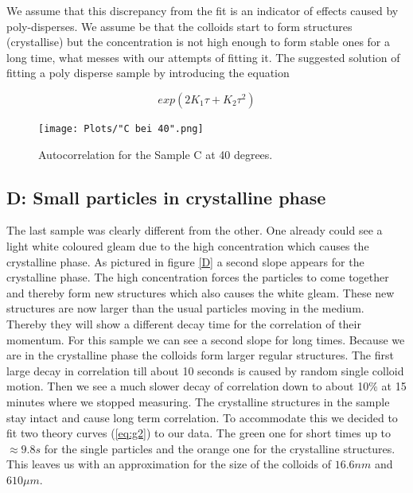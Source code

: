 \documentclass[]{article}
\begin{document}
We assume that this discrepancy from the fit is an indicator of effects caused by poly-disperses. We assume be that the colloids start to form structures (crystallise) but the concentration is not high enough to form stable ones for a long time, what messes with our attempts of fitting it. The suggested solution of fitting a poly disperse sample by introducing the equation 

\begin{equation}
	exp(2 K_1\tau +K_2 \tau^2)	
\end{equation}

\begin{figure}[!htbp]
\centering
\texttt{[image: Plots/"C bei 40".png]}
\caption{Autocorrelation for the Sample C at 40 degrees.}
\label{C}
\end{figure}

\subsection{D: Small particles in crystalline phase}
The last sample was clearly different from the other. One already could see a light white coloured gleam due to the high concentration which causes the crystalline phase. As pictured in figure \ref{D} a second slope appears for the crystalline phase. The high concentration forces the particles to come together and thereby form new structures which also causes the white gleam. These new structures are now larger than the usual particles moving in the medium. Thereby they will show a different decay time for the correlation of their momentum.
For this sample we can see a second slope for long times. Because we are in the crystalline phase the colloids form larger regular structures. The first large decay in correlation till about 10 seconds is caused by random single colloid motion. Then we see a much slower decay of correlation down to about 10$\%$ at 15 minutes where we stopped measuring. The crystalline structures in the sample stay intact and cause long term correlation. 
To accommodate this we decided to fit two theory curves (\ref{eq:g2}) to our data. The green one for short times up to $\approx 9.8s$ for the single particles and the orange one for the crystalline structures. This leaves us with an approximation for the size of the colloids of $16.6nm$ and $610\mu m$.
\end{document}
